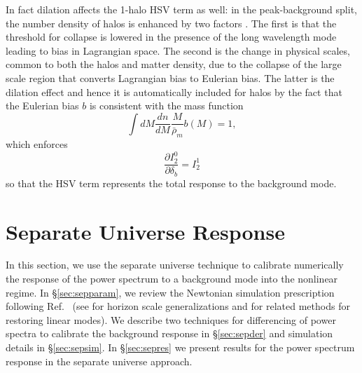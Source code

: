 \documentclass[prd,twocolumn,amsmath,amssymb,floatfix,superscriptaddress]{revtex4-1}
\begin{document}
  In fact dilation affects the 1-halo HSV term as
well: in the peak-background split, the number density of halos is enhanced by two factors \cite{Moetal:97}.
The first is that the threshold for collapse is lowered in the presence of the long wavelength
mode leading to bias in Lagrangian space.    The second is the change in physical
scales, common to both the halos and matter density,
due to the collapse of the large scale region that converts Lagrangian bias to Eulerian bias.   The latter is the dilation effect and hence it is automatically included for halos by the fact that the Eulerian 
bias $b$ is consistent with the mass function
%
\begin{equation}
\int\!\!dM\frac{dn}{dM} \frac{M}{\bar{\rho}_m} b(M) = 1,
\end{equation}
which enforces
\begin{equation}
\frac{ \partial I_2^0}{\partial \delta_b} = I_2^1
\label{eq:Iconsistency}
\end{equation}
so that the HSV term represents the total response to the background mode.



\section{Separate Universe Response}
\label{sec:separate}


In this section, we use the separate universe technique to calibrate numerically the 
response of the power spectrum to a background mode into the nonlinear regime.
In \S \ref{sec:sepparam}, we review the Newtonian simulation prescription following Ref.~\cite{Sirko:05} (see  \cite{Baldauf:2011bh,Gnedin:2011kj} for horizon scale generalizations
and \cite{1996ApJ...472...14T,1997MNRAS.286...38C,Schneider:2011wf} for related 
methods for restoring linear modes).
We describe two techniques for
differencing of power spectra to calibrate the background response in  \S \ref{sec:sepder} and
simulation details in  \S \ref{sec:sepsim}.   In \S \ref{sec:sepres} we present results for the power spectrum response in the separate universe approach.
\end{document}
